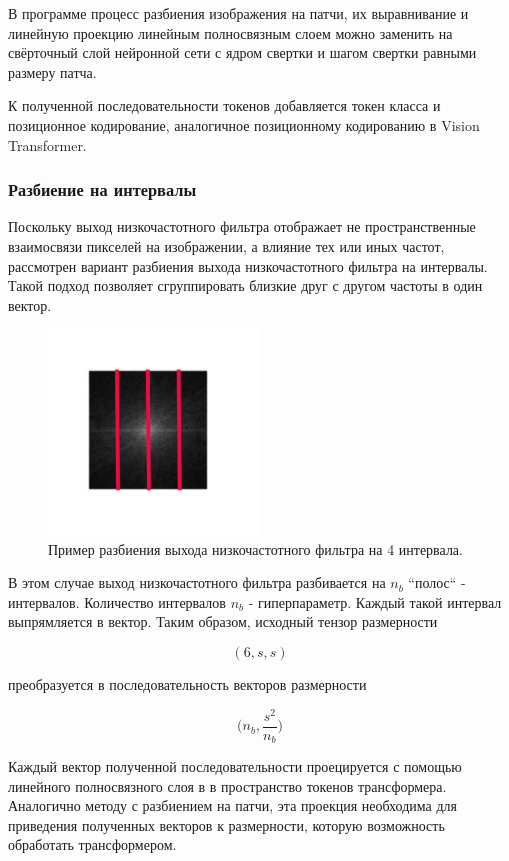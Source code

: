\documentclass[times,specification,annotation]{itmo-student-thesis}
\begin{document}
В программе процесс разбиения изображения на патчи, их выравнивание и линейную проекцию линейным полносвязным слоем можно заменить на свёрточный слой нейронной сети с ядром свертки и шагом свертки равными размеру патча.

К полученной последовательности токенов добавляется токен класса и позиционное кодирование, аналогичное позиционному кодированию в Vision Transformer.

\subsubsection{Разбиение на интервалы}

Поскольку выход низкочастотного фильтра отображает не пространственные взаимосвязи пикселей на изображении, а влияние тех или иных частот, рассмотрен вариант разбиения выхода низкочастотного фильтра на интервалы. Такой подход позволяет сгруппировать близкие друг с другом частоты в один вектор.

\begin{figure}[H]
    \centering
    \includegraphics[width=0.5\textwidth]
    {images/research/fourier/bins_split.png}
    \caption{Пример разбиения выхода низкочастотного фильтра на 4 интервала.}
\end{figure}

В этом случае выход низкочастотного фильтра разбивается на $n_b$ ``полос`` - интервалов. Количество интервалов $n_b$ - гиперпараметр. Каждый такой интервал выпрямляется в вектор. Таким образом, исходный тензор размерности 

$$
(6, s, s) 
$$

преобразуется в последовательность векторов размерности

$$
\Big(n_b, \dfrac{s^2}{n_b}\Big)
$$

Каждый вектор полученной последовательности проецируется с помощью линейного полносвязного слоя в в пространство токенов трансформера. Аналогично методу с разбиением на патчи, эта проекция необходима для приведения полученных векторов к размерности, которую возможность обработать трансформером.
\end{document}
